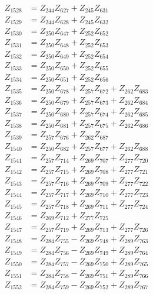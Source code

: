 \begin{multicols}{2}
\begin{align}
Z_{1528} &= Z_{244}Z_{627} + Z_{245}Z_{631} \nonumber \\
Z_{1529} &= Z_{244}Z_{628} + Z_{245}Z_{632} \nonumber \\
Z_{1530} &= Z_{250}Z_{647} + Z_{252}Z_{652} \nonumber \\
Z_{1531} &= Z_{250}Z_{648} + Z_{252}Z_{653} \nonumber \\
Z_{1532} &= Z_{250}Z_{649} + Z_{252}Z_{654} \nonumber \\
Z_{1533} &= Z_{250}Z_{650} + Z_{252}Z_{655} \nonumber \\
Z_{1534} &= Z_{250}Z_{651} + Z_{252}Z_{656} \nonumber \\
Z_{1535} &= Z_{250}Z_{678} + Z_{257}Z_{672} + Z_{262}Z_{683} \nonumber \\
Z_{1536} &= Z_{250}Z_{679} + Z_{257}Z_{673} + Z_{262}Z_{684} \nonumber \\
Z_{1537} &= Z_{250}Z_{680} + Z_{257}Z_{674} + Z_{262}Z_{685} \nonumber \\
Z_{1538} &= Z_{250}Z_{681} + Z_{257}Z_{675} + Z_{262}Z_{686} \nonumber \\
Z_{1539} &= Z_{257}Z_{676} + Z_{262}Z_{687} \nonumber \\
Z_{1540} &= Z_{250}Z_{682} + Z_{257}Z_{677} + Z_{262}Z_{688} \nonumber \\
Z_{1541} &= Z_{257}Z_{714} + Z_{269}Z_{707} + Z_{277}Z_{720} \nonumber \\
Z_{1542} &= Z_{257}Z_{715} + Z_{269}Z_{708} + Z_{277}Z_{721} \nonumber \\
Z_{1543} &= Z_{257}Z_{716} + Z_{269}Z_{709} + Z_{277}Z_{722} \nonumber \\
Z_{1544} &= Z_{257}Z_{717} + Z_{269}Z_{710} + Z_{277}Z_{723} \nonumber \\
Z_{1545} &= Z_{257}Z_{718} + Z_{269}Z_{711} + Z_{277}Z_{724} \nonumber \\
Z_{1546} &= Z_{269}Z_{712} + Z_{277}Z_{725} \nonumber \\
Z_{1547} &= Z_{257}Z_{719} + Z_{269}Z_{713} + Z_{277}Z_{726} \nonumber \\
Z_{1548} &= Z_{284}Z_{755} - Z_{269}Z_{748} + Z_{289}Z_{763} \nonumber \\
Z_{1549} &= Z_{284}Z_{756} - Z_{269}Z_{749} + Z_{289}Z_{764} \nonumber \\
Z_{1550} &= Z_{284}Z_{757} - Z_{269}Z_{750} + Z_{289}Z_{765} \nonumber \\
Z_{1551} &= Z_{284}Z_{758} - Z_{269}Z_{751} + Z_{289}Z_{766} \nonumber \\
Z_{1552} &= Z_{284}Z_{759} - Z_{269}Z_{752} + Z_{289}Z_{767} \nonumber \\

\end{align}
\end{multicols}
